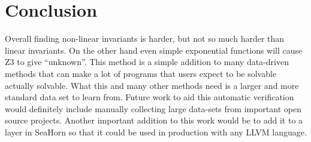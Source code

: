 \documentclass[letterpaper,twocolumn,10pt]{article}
\begin{document}
\section{Conclusion}

Overall finding non-linear invariants is harder, but not so much harder than
linear invariants. On the other hand even simple exponential functions will
cause Z3 to give ``unknown''.
This method is a simple addition to many data-driven methods that can make a lot
of programs that users expect to be solvable actually solvable. What this and
many other methods need is a larger and more standard data set to learn from.
Future work to aid this automatic verification would definitely include manually
collecting large data-sets from important open source projects.
Another important addition to this work would be to add it to a layer in SeaHorn
so that it could be used in production with any LLVM language.

\vfill

\pagebreak

{
\footnotesize


}


\end{document}
